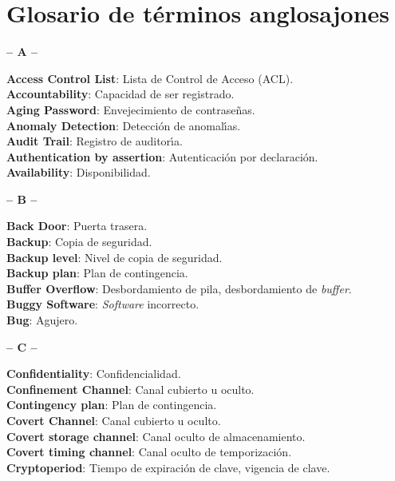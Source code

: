 \chapter{Glosario de t\'erminos anglosajones}
\begin{center}
{\large {\bf -- A --}}\\
\end{center}
{\bf Access Control List}: Lista de Control de Acceso (ACL).\\
{\bf Accountability}: Capacidad de ser registrado.\\
{\bf Aging Password}: Envejecimiento de contrase\~nas.\\
{\bf Anomaly Detection}: Detecci\'on de anomal\'{\i}as.\\
{\bf Audit Trail}: Registro de auditor\'{\i}a.\\
{\bf Authentication by assertion}: Autenticaci\'on por declaraci\'on.\\
{\bf Availability}: Disponibilidad.\\
\begin{center}
{\large {\bf -- B --}}\\
\end{center}
{\bf Back Door}: Puerta trasera.\\
{\bf Backup}: Copia de seguridad.\\
{\bf Backup level}: Nivel de copia de seguridad.\\
{\bf Backup plan}: Plan de contingencia.\\
{\bf Buffer Overflow}: Desbordamiento de pila, desbordamiento de {\it buffer}.\\
{\bf Buggy Software}: {\it Software} incorrecto.\\
{\bf Bug}: Agujero.\\
\begin{center}
{\large {\bf -- C --}}\\
\end{center}
{\bf Confidentiality}: Confidencialidad.\\
{\bf Confinement Channel}: Canal cubierto u oculto.\\
{\bf Contingency plan}: Plan de contingencia.\\
{\bf Covert Channel}: Canal cubierto u oculto.\\
{\bf Covert storage channel}: Canal oculto de almacenamiento.\\
{\bf Covert timing channel}: Canal oculto de temporizaci\'on.\\
{\bf Cryptoperiod}: Tiempo de expiraci\'on de clave, vigencia de clave.\\
